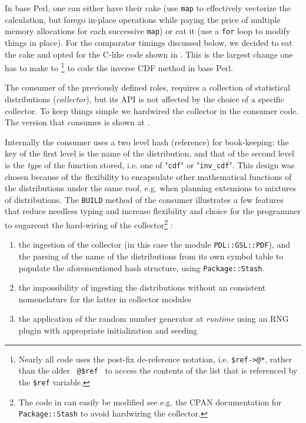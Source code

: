 \documentclass[10pt]{article}
\begin{document}
In base Perl, one can either have their cake (use \texttt{map} to effectively vectorize the calculation, but forego in-place operations while paying the price of multiple memory allocations for each successive \texttt{map}) or eat it (use a \texttt{for} loop to modify things in place). For the comparator timings discussed below, we decided to eat the cake and opted for the C-like code shown in . This is the largest change one has to make to \footnote{Nearly all code uses the post-fix de-reference notation, i.e. \texttt{\$ref->@*}, rather than the older \texttt{ @{\$ref} } to access the contents of the list that is referenced by the \texttt{\$ref} variable.} to code the inverse CDF method in base Perl. 



The consumer of the previously defined roles, requires a collection of statistical distributions (\textit{collector}), but its API is not affected by the choice of a specific collector. To keep things simple we hardwired the collector in the consumer code. The version that consumes  is shown at .


Internally the consumer uses a two level hash (reference) for book-keeping: the key of the first level is the name of the distribution, and that of the second level is the \textit{type} of the function stored, i.e. one of "\texttt{cdf}" or "\texttt{inv\_cdf}". This design was chosen because of the flexibility to encapsulate other mathematical functions of the distributions under the same roof, e.g. when planning extensions to mixtures of distributions. The \texttt{BUILD} method of the consumer illustrates a few features that reduce needless typing and increase flexibility and choice for the programmer to sugarcoat the hard-wiring of the collector\footnote{The code in  can easily be modified see e.g.  the CPAN documentation for \texttt{Package::Stash} to avoid hardwiring the collector.} :
\begin{enumerate}
\item the ingestion of the collector (in this case the module \texttt{PDL::GSL::PDF}), and the parsing of the name of the distributions from its own symbol table to populate the aforementioned hash structure, using \texttt{Package::Stash}.
\item the impossibility of ingesting the distributions without an consistent nomenclature for the latter in collector modules
\item the application of the random number generator at \textit{runtime} using an RNG plugin with appropriate initialization and seeding
\end{enumerate}
\end{document}
